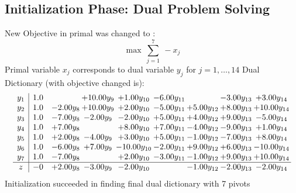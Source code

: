 \documentclass[8pt]{article}
\begin{document}
\subsection{Initialization Phase: Dual Problem Solving}
New Objective in primal was changed to : \[ \max\ \sum_{j=1}^{7}\ - x_j \] 
Primal variable $x_j$ corresponds to dual variable $y_j$ for $j = 1,\ldots,14$
Dual Dictionary (with objective changed is): 
\[\begin{array}{c| c c@{\hskip 2pt} c@{\hskip 2pt} c@{\hskip 2pt} c@{\hskip 2pt} c@{\hskip 2pt} c@{\hskip 2pt} c@{\hskip 2pt} }
 y_{1}   &  1.0  &   & + 10.00 y_{9} & +  1.00 y_{10} & -6.00 y_{11} &   & -3.00 y_{13} & +  3.00 y_{14}\\
 y_{2}   &  1.0 & -2.00 y_{8} & + 10.00 y_{9} & +  2.00 y_{10} & -5.00 y_{11} & +  5.00 y_{12} & +  8.00 y_{13} & + 10.00 y_{14}\\
 y_{3}   &  1.0 & -7.00 y_{8} & -2.00 y_{9} & -2.00 y_{10} & +  5.00 y_{11} & +  4.00 y_{12} & +  9.00 y_{13} & -5.00 y_{14}\\
 y_{4}   &  1.0 & +  7.00 y_{8} &   & +  8.00 y_{10} & +  7.00 y_{11} & -4.00 y_{12} & -9.00 y_{13} & +  1.00 y_{14}\\
 y_{5}   &  1.0 & +  2.00 y_{8} & -4.00 y_{9} & +  3.00 y_{10} & +  5.00 y_{11} & -1.00 y_{12} & -7.00 y_{13} & +  8.00 y_{14}\\
 y_{6}   &  1.0 & -6.00 y_{8} & +  7.00 y_{9} & -10.00 y_{10} & -2.00 y_{11} & +  9.00 y_{12} & +  6.00 y_{13} & -10.00 y_{14}\\
 y_{7}   &  1.0 & -7.00 y_{8} &   & +  2.00 y_{10} & -3.00 y_{11} & -1.00 y_{12} & +  9.00 y_{13} & + 10.00 y_{14}\\
\hline
z    &  -0 & +  2.00 y_{8} & -3.00 y_{9} & -2.00 y_{10} &   & -1.00 y_{12} & -2.00 y_{13} & -2.00 y_{14}\\
\end{array}\]
Initialization succeeded in finding final dual dictionary with 7 pivots
\end{document}
